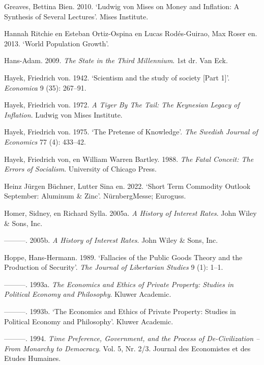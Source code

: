 \documentclass[
  a5paper,
  smalldemyvopaper,11pt,twoside,onecolumn,openright,extrafontsizes,
hidelinks]{memoir}
\newlength{\cslhangindent}
\newenvironment{CSLReferences}[2] %
 {\begin{list}{}{%
  \setlength{\itemindent}{0pt}
  \setlength{\leftmargin}{0pt}
  \setlength{\parsep}{0pt}
  \ifodd #1
   \setlength{\leftmargin}{\cslhangindent}
   \setlength{\itemindent}{-1\cslhangindent}
  \fi
  \setlength{\itemsep}{#2\baselineskip}}}
 {\end{list}}
\begin{document}
\begin{CSLReferences}{1}{0}
Greaves, Bettina Bien. 2010. {`Ludwig von Mises on Money and Inflation:
A Synthesis of Several Lectures'}. Mises Institute.

Hannah Ritchie en Esteban Ortiz-Ospina en Lucas Rodés-Guirao, Max Roser
en. 2013. {`World Population Growth'}.

Hans-Adam. 2009. \emph{The State in the Third Millennium}. 1st dr. Van
Eck.

Hayek, Friedrich von. 1942. {`Scientism and the study of society {[}Part
1{]}'}. \emph{Economica} 9 (35): 267--91.

Hayek, Friedrich von. 1972. \emph{A Tiger By The Tail: The Keynesian
Legacy of Inflation}. Ludwig von Mises Institute.

Hayek, Friedrich von. 1975. {`The Pretense of Knowledge'}. \emph{The
Swedish Journal of Economics} 77 (4): 433--42.

Hayek, Friedrich von, en William Warren Bartley. 1988. \emph{The Fatal
Conceit: The Errors of Socialism}. University of Chicago Press.

Heinz Jürgen Büchner, Lutter Sina en. 2022. {`Short Term Commodity
Outlook September: Aluminum \& Zinc'}. NürnbergMesse; Euroguss.

Homer, Sidney, en Richard Sylla. 2005a. \emph{A History of Interest
Rates}. John Wiley \& Sons, Inc.

---------. 2005b. \emph{A History of Interest Rates}. John Wiley \&
Sons, Inc.

Hoppe, Hans-Hermann. 1989. {`Fallacies of the Public Goods Theory and
the Production of Security'}. \emph{The Journal of Libertarian Studies}
9 (1): 1--1.

---------. 1993a. \emph{The Economics and Ethics of Private Property:
Studies in Political Economy and Philosophy}. Kluwer Academic.

---------. 1993b. {`The Economics and Ethics of Private Property:
Studies in Political Economy and Philosophy'}. Kluwer Academic.

---------. 1994. \emph{Time Preference, Government, and the Process of
De-Civilization -- From Monarchy to Democracy}. Vol. 5, Nr. 2/3. Journal
des Economistes et des Etudes Humaines.


\end{CSLReferences}
\end{document}
